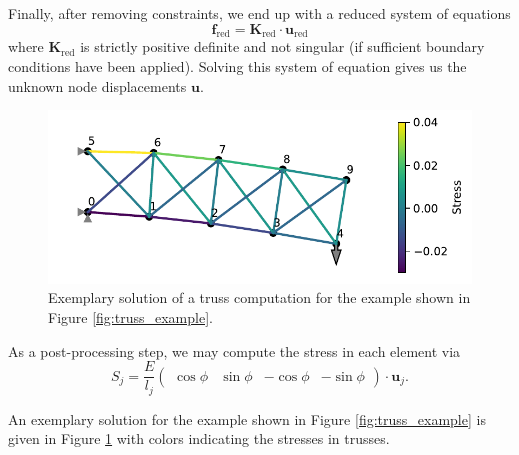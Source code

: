 Finally, after removing constraints, we end up with a reduced system of equations 
\begin{equation}
     \mathbf{f}_\textrm{red} = \mathbf{K}_\textrm{red}  \cdot \mathbf{u}_\textrm{red} 
     \label{eq:reduced_system}
\end{equation}
where $\mathbf{K}_\textrm{red}$ is strictly positive definite and not singular (if sufficient boundary conditions have been applied). Solving this system of equation gives us the unknown node displacements $\mathbf{u}$. 

\begin{figure}[!htpb]
    \centering
    \includegraphics[width=\textwidth]{figures/truss_sample_solved.pdf}
    \caption{Exemplary solution of a truss computation for the example shown in Figure \ref{fig:truss_example}.}
    \label{fig:truss_example_solved}
\end{figure}

As a post-processing step, we may compute the stress in each element via
\begin{equation}
    S_j = \frac{E}{l_j} 
    \begin{pmatrix}
        \cos{\phi} & \sin{\phi} & -\cos{\phi} & -\sin{\phi}
    \end{pmatrix}
    \cdot 
    \mathbf{u}_j.
\end{equation}

An exemplary solution for the example shown in Figure \ref{fig:truss_example} is given in Figure \ref{fig:truss_example_solved} with colors indicating the stresses in trusses.

